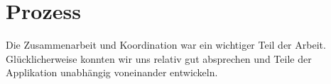 \section{Prozess}
Die Zusammenarbeit und Koordination war ein wichtiger Teil der Arbeit. Glücklicherweise konnten wir uns relativ gut absprechen und Teile der Applikation unabhängig voneinander entwickeln. 





